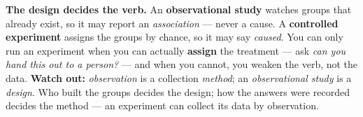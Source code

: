 \documentclass[12pt]{article}
\begin{document}
\vspace{0.14in}

\begin{remindbox}
\small
\textbf{The design decides the verb.} An \textbf{observational study} watches groups that
already exist, so it may report an \emph{association} --- never a cause. A \textbf{controlled
experiment} assigns the groups by chance, so it may say \emph{caused}. You can only run an
experiment when you can actually \textbf{assign} the treatment --- ask \emph{can you hand this
out to a person?} --- and when you cannot, you weaken the verb, not the data. \textbf{Watch
out:} \emph{observation} is a collection \emph{method}; an \emph{observational study} is a
\emph{design}. Who built the groups decides the design; how the answers were recorded decides
the method --- an experiment can collect its data by observation.
\end{remindbox}
\end{document}
